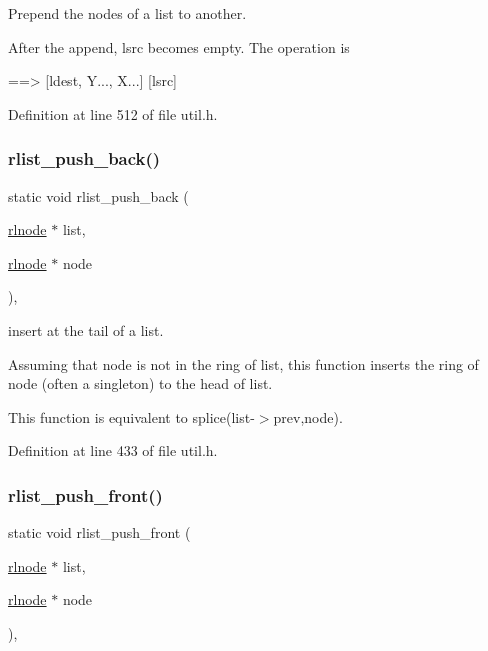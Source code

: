 Prepend the nodes of a list to another. 

After the append, {\ttfamily lsrc} becomes empty. The operation is \begin{DoxyVerb}[ldest, X...] [lsrc, Y...]  ==> [ldest, Y..., X...]  [lsrc]
\end{DoxyVerb}
 

Definition at line 512 of file util.\+h.

\mbox{\label{group__rlists_gac454004e8fb74ccd539e7fbd1affa86a}} 
\subsubsection{\texorpdfstring{rlist\+\_\+push\+\_\+back()}{rlist\_push\_back()}}
{\footnotesize\ttfamily static void rlist\+\_\+push\+\_\+back (\begin{DoxyParamCaption}\item[{\hyperlink{group__rlists_ga8f6244877f7ce2322c90525217ea6e7a}{rlnode} $\ast$}]{list,  }\item[{\hyperlink{group__rlists_ga8f6244877f7ce2322c90525217ea6e7a}{rlnode} $\ast$}]{node }\end{DoxyParamCaption})\hspace{0.3cm}{\ttfamily [inline]}, {\ttfamily [static]}}



insert at the tail of a list. 

Assuming that {\ttfamily node} is not in the ring of {\ttfamily list}, this function inserts the ring of {\ttfamily node} (often a singleton) to the head of {\ttfamily list}.

This function is equivalent to {\ttfamily splice}(list-\/$>$prev,node). 

Definition at line 433 of file util.\+h.

\mbox{\label{group__rlists_ga63ab59e50f2007a6bfedb0180a73b06f}} 
\subsubsection{\texorpdfstring{rlist\+\_\+push\+\_\+front()}{rlist\_push\_front()}}
{\footnotesize\ttfamily static void rlist\+\_\+push\+\_\+front (\begin{DoxyParamCaption}\item[{\hyperlink{group__rlists_ga8f6244877f7ce2322c90525217ea6e7a}{rlnode} $\ast$}]{list,  }\item[{\hyperlink{group__rlists_ga8f6244877f7ce2322c90525217ea6e7a}{rlnode} $\ast$}]{node }\end{DoxyParamCaption})\hspace{0.3cm}{\ttfamily [inline]}, {\ttfamily [static]}}



